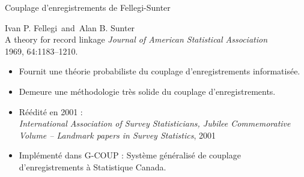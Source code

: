 
\begin{frame}{\vskip -0.2cm \Large Couplage d'enregistrements de Fellegi-Sunter}

\pause


\Large
\begin{center}
\vskip -0.035cm
Ivan P. Fellegi \,and\, Alan B. Sunter\\
A theory for record linkage
\vskip 0.15cm
\small
\textit{Journal of American Statistical Association}\\
1969, 64:1183--1210.
\end{center}

\vskip 0.2cm

\footnotesize
\begin{itemize}
\pause\item
	Fournit une th\'eorie probabiliste du couplage d'enregistrements informatis\'ee.
\pause\item
	Demeure une m\'ethodologie tr\`es solide du couplage d'enregistrements.
\pause\item
	R\'e\'edit\'e en 2001 :\\
	\textit{International Association of Survey Statisticians, Jubilee Commemorative Volume -- Landmark papers in Survey Statistics}, 2001
\pause\item
	Impl\'ement\'e dans G-COUP : Syst\`eme g\'en\'eralis\'e de couplage d'enregistrements \`a Statistique Canada.
\end{itemize}

\end{frame}
\normalsize



